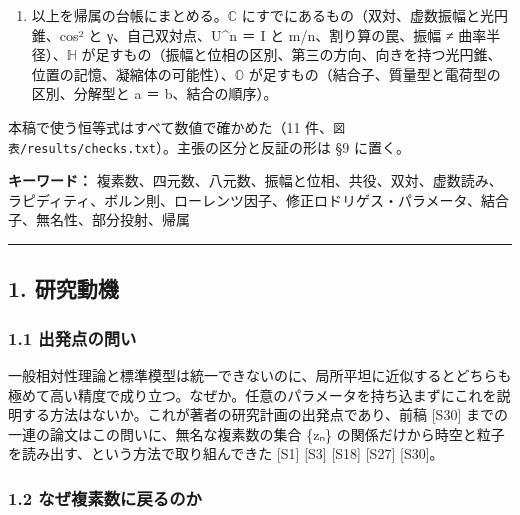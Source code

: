 \documentclass[
  a4paper,
]{ltjsarticle}
\begin{document}
\begin{enumerate}
  と内部側の四元数 b ＝ R ＋ Q₁i ＋ Q₂j ＋ Q₃k で、同じ 1 ＋ 3
  の分け方が繰り返される。読み B：質量 ＝ 時空曲率
  R（内部側のスカラー部）、電荷 ＝ 内部曲率
  Q（内部側のベクトル部）。振幅 ＝ \textbar b\textbar。前稿の仮説
  1（質量 ∝ ノルム）はこの読みで精密化される。
\item
  以上を帰属の台帳にまとめる。\(\mathbb{C}\)
  にすでにあるもの（双対、虚数振幅と光円錐、cos² と
  γ、自己双対点、U\^{}n ＝ I と m/n、割り算の罠、振幅 ≠
  曲率半径）、\(\mathbb{H}\)
  が足すもの（振幅と位相の区別、第三の方向、向きを持つ光円錐、位置の記憶、凝縮体の可能性）、\(\mathbb{O}\)
  が足すもの（結合子、質量型と電荷型の区別、分解型と
  \textbar a\textbar{} ＝ \textbar b\textbar、結合の順序）。
\end{enumerate}

本稿で使う恒等式はすべて数値で確かめた（11
件、\texttt{図表/\allowbreak{}results/\allowbreak{}checks.txt}）。主張の区分と反証の形は §9
に置く。

\textbf{キーワード：}
複素数、四元数、八元数、振幅と位相、共役、双対、虚数読み、ラピディティ、ボルン則、ローレンツ因子、修正ロドリゲス・パラメータ、結合子、無名性、部分投射、帰属

\begin{center}\rule{0.5\linewidth}{0.5pt}\end{center}

\subsection{1. 研究動機}\label{ux7814ux7a76ux52d5ux6a5f}

\subsubsection{1.1
出発点の問い}\label{ux51faux767aux70b9ux306eux554fux3044}

一般相対性理論と標準模型は統一できないのに、局所平坦に近似するとどちらも極めて高い精度で成り立つ。なぜか。任意のパラメータを持ち込まずにこれを説明する方法はないか。これが著者の研究計画の出発点であり、前稿
{[}S30{]} までの一連の論文はこの問いに、無名な複素数の集合 \{zₙ\}
の関係だけから時空と粒子を読み出す、という方法で取り組んできた {[}S1{]}
{[}S3{]} {[}S18{]} {[}S27{]} {[}S30{]}。

\subsubsection{1.2
なぜ複素数に戻るのか}\label{ux306aux305cux8907ux7d20ux6570ux306bux623bux308bux306eux304b}
\end{document}
